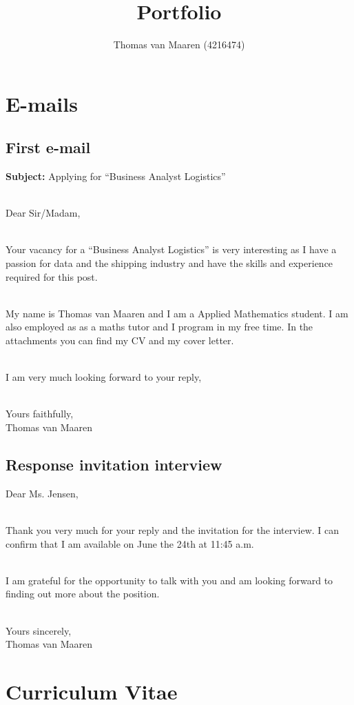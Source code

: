 \documentclass[titlepage]{article}
\author{Thomas van Maaren (4216474)}
\title{Portfolio}
\begin{document}
\maketitle{}
\tableofcontents
\section{E-mails}
\subsection{First e-mail}

\textbf{Subject:} Applying for “Business Analyst Logistics”

\ 
\\
Dear Sir/Madam,

\ 
\\
Your vacancy for a “Business Analyst Logistics” is very interesting as I
have a passion for data and the shipping industry and have the skills and
experience required for this post.

\ 
\\
My name is Thomas van Maaren and I am a Applied Mathematics student. I am
also employed as as a maths tutor and I program in my free time.  In the attachments you can
find my CV and my cover letter.

\ 
\\
I am very much looking forward to your reply,

\ 
\\
Yours faithfully,
\\
Thomas van Maaren
\subsection{Response invitation interview}

Dear Ms. Jensen,

\ 
\\
Thank you very much for your reply and the invitation for the interview. I can
confirm that I am available on June the 24th at 11:45 a.m.

\ 
\\
I am grateful for the opportunity to talk with you and am looking forward to
finding out more about the position.

\ 
\\
Yours sincerely,
\\
Thomas van Maaren
\section{Curriculum Vitae}
\end{document}
